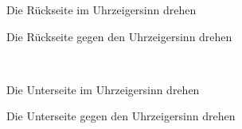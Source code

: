 \begin{instruction}{Die Rückseite im Uhrzeigersinn drehen}
  \vspace{1.3em}
  \RubikCubeSolved%
  \quad{}
\end{instruction}
\hfil
\begin{instruction}{Die Rückseite gegen den Uhrzeigersinn drehen}
  \vspace{1.3em}
  \RubikCubeSolved%
  \quad{}
\end{instruction}\\[3em]
\begin{instruction}{Die Unterseite im Uhrzeigersinn drehen}
  \vspace{1.3em}
  \RubikCubeSolved%
  \quad{}
\end{instruction}
\hfil
\begin{instruction}{Die Unterseite gegen den Uhrzeigersinn drehen}
  \vspace{1.3em}
  \RubikCubeSolved%
  \quad{}
\end{instruction}\\[3em]
